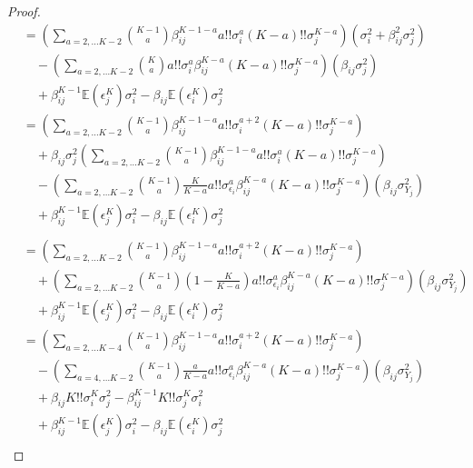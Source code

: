 \documentclass[]{article}
\newcommand{\E}{\mathbb{E}}
\begin{document}
\begin{proof}
\begin{equation}
\begin{aligned}
&= \left(\sum_{a = 2,\ldots K-2}{K-1 \choose a} \beta_{ij}^{K-1 - a}a!! \sigma_{i}^a (K-a)!!\sigma_{j}^{K-a}\right) \left(\sigma_{i}^2  + \beta_{ij}^2\sigma_{j}^2 \right)
\\
&\quad - \left(\sum_{a = 2,\ldots K-2}{K \choose a} a!!\sigma_{i}^a \beta_{ij}^{K - a}(K-a)!!\sigma_{j}^{K-a}\right)\left(\beta_{ij}\sigma_{j}^2\right)\\
& \quad + \beta_{ij}^{K-1}\E(\epsilon_j^K)\sigma_i^2 - \beta_{ij}\E(\epsilon_i^K)\sigma_j^2\\
&= \left(\sum_{a = 2,\ldots K-2}{K-1 \choose a} \beta_{ij}^{K-1 - a}a!! \sigma_{i}^{a + 2} (K-a)!!\sigma_{j}^{K-a}\right)
\\
& \quad + \beta_{ij}\sigma_{j}^2 \left(\sum_{a = 2,\ldots K-2}{K-1 \choose a} \beta_{ij}^{K-1 - a}a!! \sigma_{i}^a (K-a)!!\sigma_{j}^{K-a}\right) \\
&\quad - \left(\sum_{a = 2,\ldots K-2}{K-1 \choose a}\frac{K}{K-a} a!!\sigma_{\epsilon_i}^a \beta_{ij}^{K - a}(K-a)!!\sigma_{j}^{K-a}\right)\left(\beta_{ij}\sigma_{Y_j}^2\right)\\
& \quad + \beta_{ij}^{K-1}\E(\epsilon_j^K)\sigma_i^2 - \beta_{ij}\E(\epsilon_i^K)\sigma_j^2\\
\\
&= \left(\sum_{a = 2,\ldots K-2}{K-1 \choose a} \beta_{ij}^{K-1 - a}a!! \sigma_{i}^{a + 2} (K-a)!!\sigma_{j}^{K-a}\right)
\\
&\quad + \left(\sum_{a = 2,\ldots K-2}{K-1 \choose a}\left(1 - \frac{K}{K-a}\right) a!!\sigma_{\epsilon_i}^a \beta_{ij}^{K - a}(K-a)!!\sigma_{j}^{K-a}\right)\left(\beta_{ij}\sigma_{Y_j}^2\right)\\
& \quad + \beta_{ij}^{K-1}\E(\epsilon_j^K)\sigma_i^2 - \beta_{ij}\E(\epsilon_i^K)\sigma_j^2\\
&= \left(\sum_{a = 2,\ldots K-4}{K-1 \choose a} \beta_{ij}^{K-1 - a}a!! \sigma_{i}^{a + 2} (K-a)!!\sigma_{j}^{K-a}\right)
\\
&\quad - \left(\sum_{a = 4,\ldots K-2}{K-1 \choose a}\frac{a}{K-a} a!!\sigma_{\epsilon_i}^a \beta_{ij}^{K - a} (K-a)!!\sigma_{j}^{K-a}\right) \left(\beta_{ij}\sigma_{Y_j}^2\right)\\
& \quad + \beta_{ij}K!!\sigma_i^K\sigma_j^2 - \beta_{ij}^{K-1}K!!\sigma_j^K \sigma_i^2\\
& \quad + \beta_{ij}^{K-1}\E(\epsilon_j^K)\sigma_i^2 - \beta_{ij}\E(\epsilon_i^K)\sigma_j^2\\
\end{aligned}
\end{equation}


\end{proof}
\end{document}
